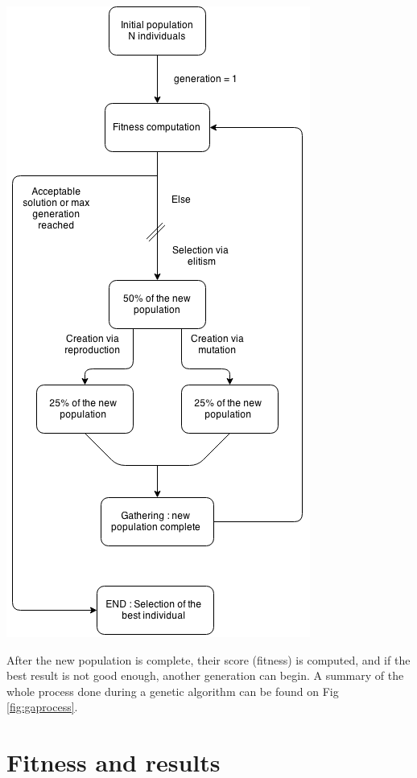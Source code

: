 \documentclass{report}
\begin{document}
	\begin{center}
		\includegraphics[scale=0.5]{ressources/ag3}	
		\label{fig:gaprocess}
	\end{center}
	\vspace{1cm}

	After the new population is complete, their score (fitness) is computed, and if the best result is not good enough, another generation can begin. A summary of the whole process done during a genetic algorithm can be found on Fig \ref{fig:gaprocess}.
	
	\section{Fitness and results}
	
\end{document}
